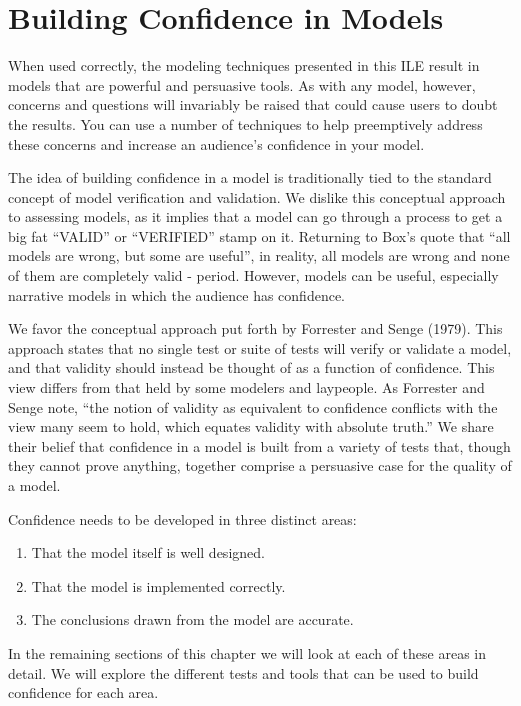 \documentclass[]{memoir}
\begin{document}
\chapter{Building Confidence in Models}

When used correctly, the modeling techniques presented in this ILE
result in models that are powerful and persuasive tools. As with any
model, however, concerns and questions will invariably be raised that
could cause users to doubt the results. You can use a number of
techniques to help preemptively address these concerns and increase an
audience's confidence in your model.

The idea of building confidence in a model is traditionally tied to the
standard concept of model verification and validation. We dislike this
conceptual approach to assessing models, as it implies that a model can
go through a process to get a big fat ``VALID'' or ``VERIFIED'' stamp on
it. Returning to Box's quote that ``all models are wrong, but some are
useful'', in reality, all models are wrong and none of them are
completely valid - period. However, models can be useful, especially
narrative models in which the audience has confidence.

We favor the conceptual approach put forth by Forrester and Senge
(1979). This approach states that no single test or suite of tests will
verify or validate a model, and that validity should instead be thought
of as a function of confidence. This view differs from that held by some
modelers and laypeople. As Forrester and Senge note, ``the notion of
validity as equivalent to confidence conflicts with the view many seem
to hold, which equates validity with absolute truth.'' We share their
belief that confidence in a model is built from a variety of tests that,
though they cannot prove anything, together comprise a persuasive case
for the quality of a model.

Confidence needs to be developed in three distinct areas:

\begin{enumerate}
\def\labelenumi{\arabic{enumi}.}
\itemsep1pt\parskip0pt
\item
  That the model itself is well designed.
\item
  That the model is implemented correctly.
\item
  The conclusions drawn from the model are accurate.
\end{enumerate}

In the remaining sections of this chapter we will look at each of these
areas in detail. We will explore the different tests and tools that can
be used to build confidence for each area.
\end{document}

